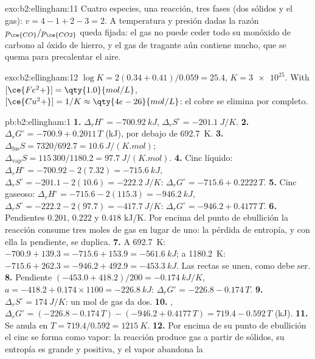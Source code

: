 \begin{solution}{exo:b2:ellingham:11}
Cuatro especies, una reacción, tres fases (dos sólidos y el gas): $v = 4 - 1 +
2 - 3 = 2$. A temperatura y presión dadas la razón $p_{\ce{CO}}/p_{\ce{CO2}}$
queda fijada: el gas no puede ceder todo su monóxido de carbono al óxido de hierro,
y el gas de tragante aún contiene mucho, que se quema para precalentar el
aire.
\end{solution}

\begin{solution}{exo:b2:ellingham:12}
$\log K = 2(0.34 + 0.41)/0.059 = 25.4$, $K = \num{3e25}$. With
$[\ce{Fe^2+}] = \qty{1.0}{mol/L}$, $[\ce{Cu^2+}] = 1/K \approx
\qty{4e-26}{mol/L}$: el cobre se elimina por completo.
\end{solution}

\begin{solution}{pb:b2:ellingham:1}
\textbf{1.} $\Delta_r H^\circ = \qty{-700.92}{kJ}$, $\Delta_r S^\circ =
\qty{-201.1}{J/K}$.
\textbf{2.} $\Delta_r G^\circ = -700.9 + 0.2011\,T$ (\unit{kJ}), por debajo de
\qty{692.7}{K}.
\textbf{3.} $\Delta_{\text{fus}}S = 7320/692.7 = \qty{10.6}{J/(K.mol)}$;
$\Delta_{\text{vap}}S = 115\,300/1180.2 = \qty{97.7}{J/(K.mol)}$.
\textbf{4.} Cinc líquido: $\Delta_r H^\circ = -700.92 - 2(7.32) = \qty{-715.6}{kJ}$,
$\Delta_r S^\circ = -201.1 - 2(10.6) = \qty{-222.2}{J/K}$: $\Delta_r G^\circ =
-715.6 + 0.2222\,T$.
\textbf{5.} Cinc gaseoso: $\Delta_r H^\circ = -715.6 - 2(115.3) = \qty{-946.2}{kJ}$,
$\Delta_r S^\circ = -222.2 - 2(97.7) = \qty{-417.7}{J/K}$: $\Delta_r G^\circ =
-946.2 + 0.4177\,T$.
\textbf{6.} Pendientes $0.201$, $0.222$ y $0.418$ \unit{kJ/K}. Por encima del punto de
ebullición la reacción consume tres moles de gas en lugar de uno: la pérdida de
entropía, y con ella la pendiente, se duplica.
\textbf{7.} A \qty{692.7}{K}: $-700.9 + 139.3 = -715.6 + 153.9 = \qty{-561.6}{kJ}$;
a \qty{1180.2}{K}: $-715.6 + 262.3 = -946.2 + 492.9 = \qty{-453.3}{kJ}$. Las
rectas se unen, como debe ser.
\textbf{8.} Pendiente $(-453.0 + 418.2)/200 = \qty{-0.174}{kJ/K}$, $a = -418.2 +
0.174 \times 1100 = \qty{-226.8}{kJ}$: $\Delta_r G^\circ = -226.8 - 0.174\,T$.
\textbf{9.} $\Delta_r S^\circ = \qty{+174}{J/K}$: un mol de gas da dos.
\textbf{10.} , $\Delta_r G^\circ = (-226.8 - 0.174\,T)
- (-946.2 + 0.4177\,T) = 719.4 - 0.592\,T$ (\unit{kJ}).
\textbf{11.} Se anula en $T = 719.4/0.592 = \qty{1215}{K}$.
\textbf{12.} Por encima de su punto de ebullición el cinc se forma como vapor: la reacción produce
gas a partir de sólidos, su entropía es grande y positiva, y el vapor abandona la

\end{solution}
